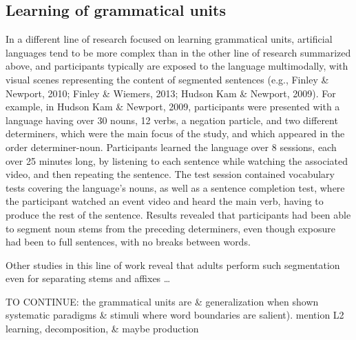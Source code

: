 \documentclass[
  american,
  ,man,floatsintext]{apa6}
\begin{document}
\hypertarget{learning-of-grammatical-units}{%
\subsection{Learning of grammatical units}\label{learning-of-grammatical-units}}

In a different line of research focused on learning grammatical units, artificial languages tend to be more complex than in the other line of research summarized above, and participants typically are exposed to the language multimodally, with visual scenes representing the content of segmented sentences (e.g., Finley \& Newport, 2010; Finley \& Wiemers, 2013; Hudson Kam \& Newport, 2009). For example, in Hudson Kam \& Newport, 2009, participants were presented with a language having over 30 nouns, 12 verbs, a negation particle, and two different determiners, which were the main focus of the study, and which appeared in the order determiner-noun. Participants learned the language over 8 sessions, each over 25 minutes long, by listening to each sentence while watching the associated video, and then repeating the sentence. The test session contained vocabulary tests covering the language's nouns, as well as a sentence completion test, where the participant watched an event video and heard the main verb, having to produce the rest of the sentence. Results revealed that participants had been able to segment noun stems from the preceding determiners, even though exposure had been to full sentences, with no breaks between words.

Other studies in this line of work reveal that adults perform such segmentation even for separating stems and affixes \ldots{}

TO CONTINUE: the grammatical units are \& generalization when shown systematic paradigms \& stimuli where word boundaries are salient). mention L2 learning, decomposition, \& maybe production
\end{document}
